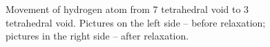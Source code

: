 \begin{figure}[h!]
\begin{minipage}[h]{0.5\linewidth}
\end{minipage}
\hfill
\begin{minipage}[h]{0.5\linewidth}
\end{minipage}
\caption{Movement of hydrogen atom from 7 tetrahedral void to 3 tetrahedral void. Pictures on the left side -- before relaxation; pictures in the right side -- after relaxation.}
\label{7to31}
\end{figure}

